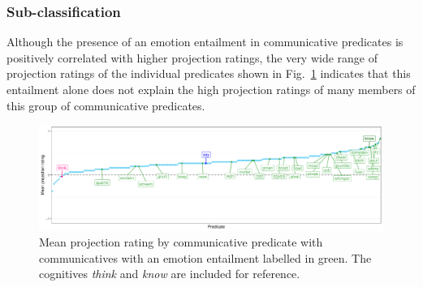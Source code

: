 \documentclass[11pt,fleqn]{article}
\newcommand{\figref}[1]{Fig.~\ref{#1}}
\newcommand{\6}{\mbox{$[\hspace*{-.6mm}[$}}
\newcommand{\9}{\mbox{$]\hspace*{-.6mm}]$}}
\begin{document}
\subsubsection{Sub-classification}

Although the presence of an emotion entailment in communicative predicates is positively correlated with higher projection ratings, the very wide range of projection ratings of the individual predicates shown in \figref{projemocomm} indicates that this entailment alone does not explain the high projection ratings of many members of this group of communicative predicates.

\begin{figure}[H]
	\centering
	\includegraphics[width=1\textwidth]{projection-by-communicative-emoComms}
	\caption{Mean projection rating by communicative predicate with communicatives with an emotion entailment labelled in green. The cognitives \emph{think} and \emph{know} are included for reference.}
	\label{projemocomm}
\end{figure}
\end{document}
